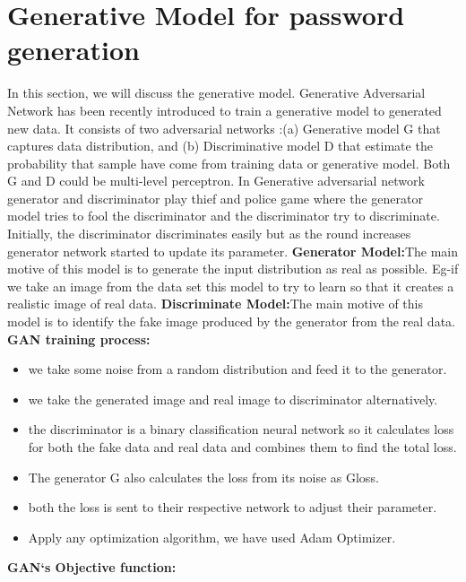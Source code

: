 \documentclass[runningheads]{llncs}
\begin{document}
\section{Generative Model for password generation}
In this section, we will discuss the generative model. Generative Adversarial Network has been recently introduced to train a generative model to generated new data. It consists of two adversarial networks :(a) Generative model G that captures data distribution, and (b) Discriminative model D that estimate the probability that sample have come from training data or generative model. Both G and D could be multi-level perceptron. In Generative adversarial network generator and discriminator play thief and police game where the generator model tries to fool the discriminator and the discriminator try to discriminate. Initially, the discriminator discriminates easily but as the round increases generator network started to update its parameter.
\newline
\textbf{Generator Model:}The main motive of this model is to generate the input distribution as real as possible. Eg-if we take an image from the data set this model to try to learn so that it creates a realistic image of real data.
\newline
\textbf{Discriminate Model:}The main motive of this model is to identify the fake image produced by the generator from the real data.
\newline
\textbf{GAN training process:}
\begin{itemize}
  \item we take some noise from a random distribution and feed it to the generator. 
  \item we take the generated image and real image to discriminator alternatively.
  \item the discriminator is a binary classification neural network so it calculates loss for both the fake data and real data and combines them to find the total loss.
  \item The generator G also calculates the loss from its noise as Gloss.
  \item both the loss is sent to their respective network to adjust their parameter.
  \item Apply any optimization algorithm, we have used Adam Optimizer.
\end{itemize}
\newline
\textbf{GAN`s Objective function:}
\end{document}
